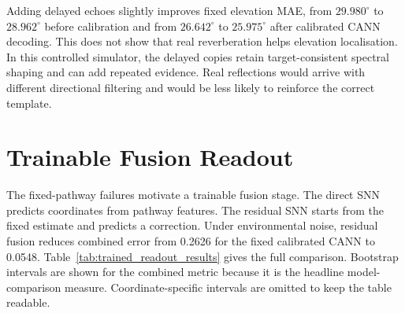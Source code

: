 Adding delayed echoes slightly improves fixed elevation MAE, from $29.980^\circ$ to $28.962^\circ$ before calibration and from $26.642^\circ$ to $25.975^\circ$ after calibrated CANN decoding. This does not show that real reverberation helps elevation localisation. In this controlled simulator, the delayed copies retain target-consistent spectral shaping and can add repeated evidence. Real reflections would arrive with different directional filtering and would be less likely to reinforce the correct template.

\section{Trainable Fusion Readout}

The fixed-pathway failures motivate a trainable fusion stage. The direct SNN predicts coordinates from pathway features. The residual SNN starts from the fixed estimate and predicts a correction. Under environmental noise, residual fusion reduces combined error from 0.2626 for the fixed calibrated CANN to 0.0548. Table~\ref{tab:trained_readout_results} gives the full comparison. Bootstrap intervals are shown for the combined metric because it is the headline model-comparison measure. Coordinate-specific intervals are omitted to keep the table readable.

